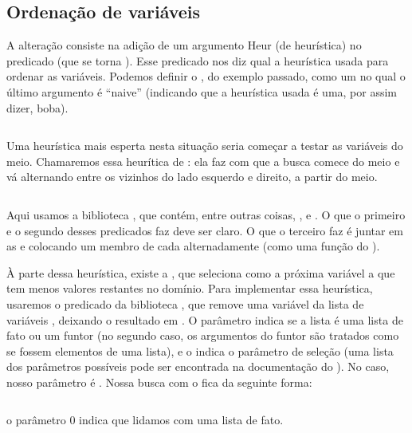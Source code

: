 \documentclass{article}
\begin{document}
\subsection{Ordenação de variáveis}

A alteração consiste na adição de um argumento Heur (de heurística) no predicado  (que se torna
). Esse predicado nos diz qual a heurística usada para ordenar as variáveis.
Podemos definir o , do exemplo passado, como um  no qual o
último argumento é ``naive'' (indicando que a heurística usada é uma, por assim dizer, boba).

\inputminted{prolog}{../Exemplos/Cap11/prog2_queensHeurNaive.ecl}

Uma heurística mais esperta nesta situação seria começar a testar as variáveis do meio. Chamaremos
essa heurítica de : ela faz com que a busca comece do meio e vá alternando
entre os vizinhos do lado esquerdo e direito, a partir do meio.

\inputminted{prolog}{../Exemplos/Cap11/prog3_queensHeurMout.ecl}

Aqui usamos a biblioteca , que contém, entre outras coisas, ,
 e . O que o primeiro e o segundo desses predicados faz deve ser
claro. O que o terceiro faz é juntar em  as  e
 colocando um membro de cada alternadamente (como uma função
 do ).

À parte dessa heurística, existe a , que seleciona como a próxima variável a
que tem menos valores restantes no domínio. Para implementar essa heurística, usaremos o predicado
da biblioteca  , que remove uma variável
 da lista de variáveis , deixando o resultado em . O parâmetro 
indica se a lista é uma lista de fato ou um funtor (no segundo caso, os argumentos do funtor são
tratados como se fossem elementos de uma lista), e o  indica o parâmetro de seleção (uma
lista dos parâmetros possíveis pode ser encontrada na documentação do \eclipse). No caso, nosso
parâmetro é . Nossa busca com o  fica da seguinte
forma:

\inputminted{prolog}{../Exemplos/Cap11/prog4_queensHeurFrstFail.ecl}

\indent o parâmetro 0 indica que lidamos com uma lista de fato.
\end{document}
